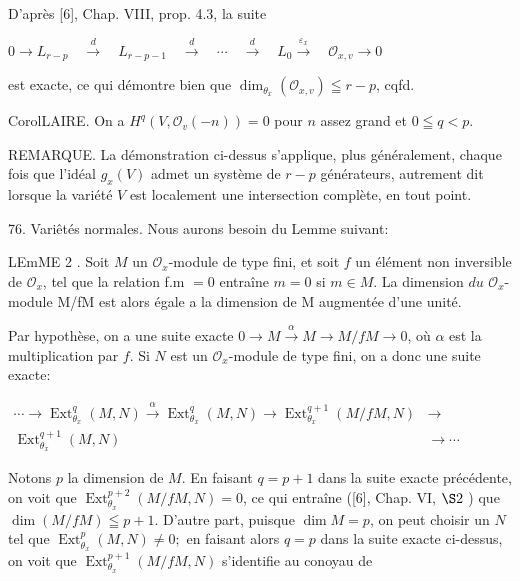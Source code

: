 D'après [6], Chap. VIII, prop. 4.3, la suite

$0 \rightarrow L_{r-p} \quad \stackrel{d}{\longrightarrow} \quad L_{r-p-1} \quad \stackrel{d}{\longrightarrow} \quad \cdots \quad \stackrel{d}{\longrightarrow} \quad L_{0} \stackrel{\varepsilon_{x}}{\longrightarrow} \quad \mathcal{O}_{x, v} \rightarrow 0$

est exacte, ce qui démontre bien que $\operatorname{dim}_{\theta_{x}}\left(\mathcal{O}_{x, v}\right) \leqq r-p$, cqfd.

CorolLAIRE. On a $H^{q}\left(V, \mathcal{O}_{v}(-n)\right)=0$ pour $n$ assez grand et $0 \leqq q<p$.

REMARQUE. La démonstration ci-dessus s'applique, plus généralement, chaque fois que l'idéal $g_{x}(V)$ admet un système de $r-p$ générateurs, autrement dit lorsque la variété $V$ est localement une intersection complète, en tout point.

76. Variêtés normales. Nous aurons besoin du Lemme suivant:

LEmME 2 . Soit $M$ un $\mathcal{O}_{x}$-module de type fini, et soit $f$ un élément non inversible de $\mathcal{O}_{x}$, tel que la relation f.m $=0$ entraîne $m=0$ si $m \in M$. La dimension $d u$ $\mathcal{O}_{x}$-module M/fM est alors égale a la dimension de M augmentée d'une unité.

Par hypothèse, on a une suite exacte $0 \rightarrow M \stackrel{\alpha}{\rightarrow} M \rightarrow M / f M \rightarrow 0$, où $\alpha$ est la multiplication par $f$. Si $N$ est un $\mathcal{O}_{x}$-module de type fini, on a donc une suite exacte:

$\begin{aligned} \cdots \rightarrow \operatorname{Ext}_{\theta_{x}}^{q}(M, N) \stackrel{\alpha}{\longrightarrow} \operatorname{Ext}_{\theta_{x}}^{q}(M, N) \rightarrow \operatorname{Ext}_{\theta_{x}}^{q+1}(M / f M, N) & \rightarrow \\ \operatorname{Ext}_{\theta_{x}}^{q+1}(M, N) & \rightarrow \cdots \end{aligned}$

Notons $p$ la dimension de $M$. En faisant $q=p+1$ dans la suite exacte précédente, on voit que $\operatorname{Ext}_{\theta_{x}}^{p+2}(M / f M, N)=0$, ce qui entraîne ([6], Chap. VI, $\S 2$ ) que $\operatorname{dim}(M / f M) \leqq p+1 .$ D'autre part, puisque $\operatorname{dim} M=p$, on peut choisir un $N$ tel que $\operatorname{Ext}_{\theta_{x}}^{p}(M, N) \neq 0 ;$ en faisant alors $q=p$ dans la suite exacte ci-dessus, on voit que $\operatorname{Ext}_{\theta_{x}}^{p+1}(M / f M, N)$ s'identifie au conoyau de

